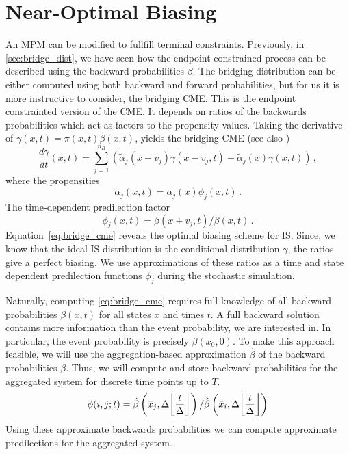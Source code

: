 \section{Near-Optimal Biasing}
An \ac{MPM} can be modified to fullfill terminal constraints.
Previously, in \autoref{sec:bridge_dist}, we have seen how the endpoint constrained process can be described using the backward probabilities $\beta$.
The bridging distribution can be either computed using both backward and forward probabilities, but for us it is more instructive to consider, the bridging \ac{CME}.
This is the endpoint constrainted version of the \ac{CME}.
It depends on ratios of the backwards probabilities which act as factors to the propensity values.
Taking the derivative of $\gamma(x,t)=\pi(x,t)\beta(x,t)$, yields the bridging \ac{CME} (see also \citet{huang2016reconstructing})
\begin{equation}\label{eq:bridge_cme}
    \frac{d\gamma}{d t} ( x,t) =
    \sum_{j=1}^{n_R}\left(
        \tilde{\alpha}_j( x- v_j)\gamma( x- v_j,t) - \tilde{\alpha}_j( x)\gamma( x,t)
    \right)\,,
\end{equation}
where the propensities
\begin{equation}
    \tilde{\alpha}_j(x, t) = \alpha_j(x)\phi_j(x, t)\,.
\end{equation}
The time-dependent predilection factor
\begin{equation}\label{eq:dyn_predilection}
    \phi_j(x, t) = {\beta(x + v_j, t)}/{\beta(x, t)}\,.
\end{equation}
Equation~\eqref{eq:bridge_cme} reveals the optimal biasing scheme for \ac{IS}.
Since, we know that the ideal \ac{IS} distribution is the conditional distribution $\gamma$, the ratios
give a perfect biasing.
We use approximations of these ratios as a time and state dependent predilection functions $\phi_j$ during the stochastic simulation.

Naturally, computing \eqref{eq:bridge_cme} requires full knowledge of all backward probabilities $\beta(x, t)$ for all states $x$ and times $t$.
A full backward solution contains more information than the event probability, we are interested in.
In particular, the event probability is precisely $\beta(x_0, 0)$.
To make this approach feasible, we will use the aggregation-based approximation $\hat{\beta}$ of the backward probabilities $\beta$.
Thus, we will compute and store backward probabilities for the aggregated system for discrete time points up to $T$.
\[
    \bar{\phi}(i, j; t) = \hat{\beta}\left(\bar{x}_j, \Delta\floor*{\frac{t}{\Delta}}\right) / \hat{\beta}\left(\bar{x}_i, \Delta\floor*{\frac{t}{\Delta}}\right)
\]
Using these approximate backwards probabilities we can compute approximate predilections for the aggregated system.

